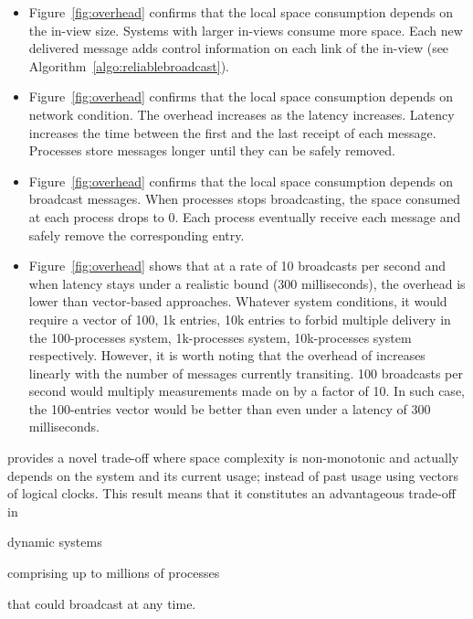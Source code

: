 \begin{itemize}[leftmargin=*]
\item Figure~\ref{fig:overhead} confirms that the local space consumption
  depends on the in-view size. Systems with larger in-views consume more
  space. Each new delivered message adds control information on each link of the
  in-view (see Algorithm~\ref{algo:reliablebroadcast}).
\item Figure~\ref{fig:overhead} confirms that the local space consumption
  depends on network condition. The overhead increases as the latency
  increases. Latency increases the time between the first and the last receipt
  of each message. Processes store messages longer until they can be safely
  removed. 
\item Figure~\ref{fig:overhead} confirms that the local space consumption
  depends on broadcast messages. When processes stops broadcasting, the space
  consumed at each process drops to 0. Each process eventually receive each
  message and safely remove the corresponding entry.
\item Figure~\ref{fig:overhead} shows that at a rate of 10 broadcasts per second
  and when latency stays under a realistic bound ($300$ milliseconds), the overhead is
  lower than vector-based approaches. Whatever system conditions, it would
  require a vector of 100, 1k entries, 10k entries to forbid multiple delivery
  in the 100-processes system, 1k-processes system, 10k-processes system
  respectively. However, it is worth noting that the overhead of \RPCBROADCAST
  increases linearly with the number of messages currently transiting. 100
  broadcasts per second would multiply measurements made on \RPCBROADCAST by a
  factor of 10. In such case, the 100-entries vector would be better than
  \RPCBROADCAST even under a latency of $300$ milliseconds. 
\end{itemize}

\noindent \RPCBROADCAST provides a novel trade-off where space complexity is
non-monotonic and actually depends on the system and its current usage; instead
of past usage using vectors of logical clocks. This result means that it
constitutes an advantageous trade-off in
\begin{inparaenum}[(i)]
\item dynamic systems
\item comprising up to millions of processes
\item that could broadcast at any time.
\end{inparaenum} \\

